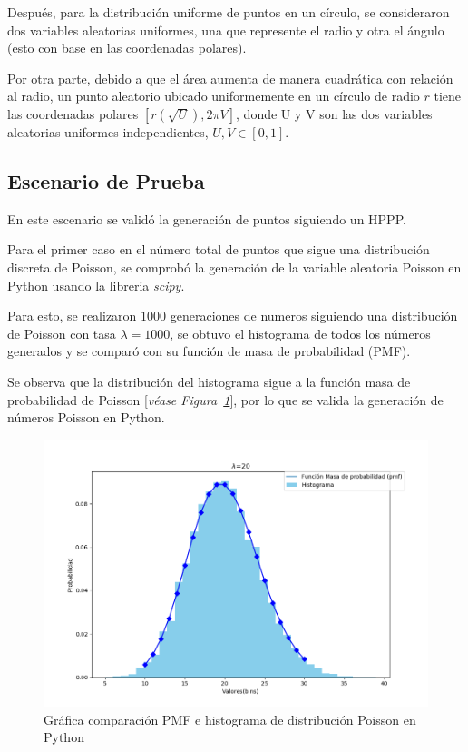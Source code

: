 Después, para la distribución uniforme de puntos en un círculo, se consideraron dos variables aleatorias uniformes, una que represente el radio y otra el ángulo (esto con base en las coordenadas polares).\newline

Por otra parte, debido a que el área aumenta de manera cuadrática con relación al radio, un punto aleatorio ubicado uniformemente en un círculo de radio $r$ tiene las coordenadas polares $[r(\sqrt{U}), 2\pi V]$, donde U y V son las dos variables aleatorias uniformes independientes, $U, V \in{[0,1]}$.

\subsection{Escenario de Prueba}

En este escenario se validó la generación de puntos siguiendo un HPPP.\newline

Para el primer caso en el número total de puntos que sigue una distribución discreta de Poisson, se comprobó la generación de la variable aleatoria Poisson en Python usando la libreria \textit{scipy}.\newline

Para esto, se realizaron $1000$ generaciones de numeros siguiendo una distribución de Poisson con tasa $\lambda = 1000$, se obtuvo el histograma de todos los números generados y se comparó con su función de masa de probabilidad (PMF).\newline

Se observa que la distribución del histograma sigue a la función masa de probabilidad de Poisson [\textit{véase Figura~\ref{fig:generacionPoisson}}], por lo que se valida la generación de números Poisson en Python.\newline

\begin{figure}[th]
    \centering
    \includegraphics[scale=.4]{Figures/PoissonDistribution}
    \decoRule
    \caption[Gráfica comparación PMF e histograma de distribución Poisson en Python]{Gráfica comparación PMF e histograma de distribución Poisson en Python}
    \label{fig:generacionPoisson}
\end{figure}

